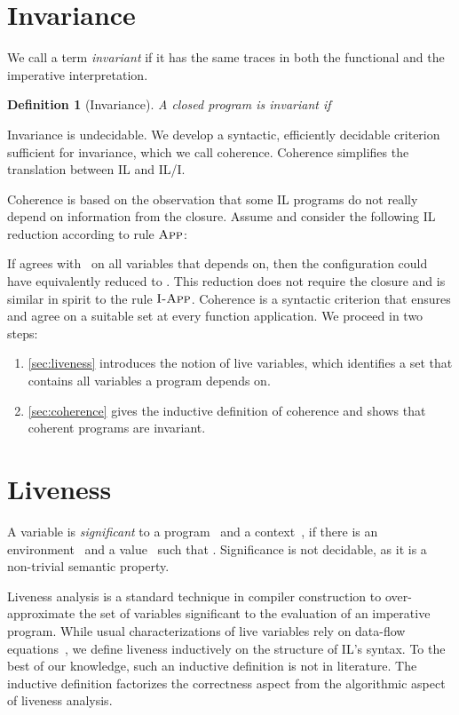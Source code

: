 \documentclass[openright,a4paper,11pt]{scrartcl}
\newcommand{\nrule}[1]{\ensuremath{\textup{\textsc{#1}}}}
\newcommand{\myref}[1]{\autoref{#1}}
\theoremstyle{plain}
\theoremstyle{plain}
\theoremstyle{plain}
\newtheorem{definition}{Definition}
\theoremstyle{plain}
\theoremstyle{nonumberplain}
\begin{document}
 \section{Invariance}
\label{sec:invariance}
We call a term \emph{invariant} if it has the same traces in both the functional and the imperative interpretation.

\begin{definition}[Invariance]
\label{def:invariance}
A closed program  is invariant if\end{definition}
Invariance is undecidable.
We develop a syntactic, efficiently decidable criterion sufficient for invariance, which we call coherence.
Coherence simplifies the translation between IL and IL/I.


Coherence is based on the observation that some IL programs do not really depend on information from the closure.
Assume  and consider the following IL reduction according to rule \nrule{App}:

If  agrees with~ on all variables  that  depends on, then the configuration could have equivalently reduced to .
This reduction does not require the closure  and is similar in spirit to the rule \nrule{I-App}.
Coherence is a syntactic criterion that ensures  and  agree on a suitable set  at every function application.
We proceed in two steps:
\begin{enumerate}
\item \myref{sec:liveness} introduces the notion of live variables, which identifies a set that contains all variables a program depends on.
\item \myref{sec:coherence} gives the inductive definition of coherence and shows that coherent programs are invariant.
\end{enumerate}








 \section{Liveness}
\label{chap:liveness}
\label{sec:liveness}
A variable  is \emph{significant} to a program~ and a context~,
if there is an environment~ and a value~ such that .
Significance is not decidable, as it is a non-trivial semantic property.

Liveness analysis is a standard technique in compiler construction to over-approximate the set of variables significant to the evaluation of an imperative program.
While usual characterizations of live variables rely on data-flow equations~\cite{Nipkow:2014},
we define liveness inductively on the structure of IL's syntax.
To the best of our knowledge, such an inductive definition is not in literature.
The inductive definition factorizes the correctness aspect from the algorithmic aspect of liveness analysis.
\end{document}
